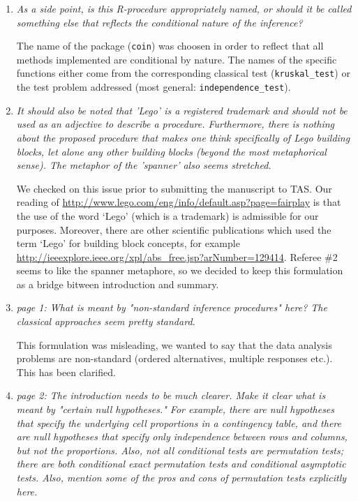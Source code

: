\documentclass[11pt]{article}
\begin{document}
\begin{enumerate}
\item \textsl{As a side point, is this R-procedure appropriately named, or should it be called 
              something else that reflects the conditional nature of the inference?}

The name of the package (\texttt{coin}) was choosen in order to reflect that
all methods implemented are conditional by nature. The names of the specific
functions either come from the corresponding classical test
(\texttt{kruskal\_test}) or the test problem addressed (most general:
\texttt{independence\_test}).

\item \textsl{It should also be noted that 'Lego' is a registered trademark and should not be used 
              as an adjective to describe a procedure. Furthermore, there is nothing about the 
              proposed procedure that makes one think specifically of Lego building blocks, 
              let alone any other building blocks (beyond the most metaphorical sense). The 
              metaphor of the 'spanner' also seems stretched.}

We checked on this issue prior to submitting the manuscript to TAS. Our
reading of \url{http://www.lego.com/eng/info/default.asp?page=fairplay} is
that the use of the word `Lego' (which is a trademark) is admissible for our
purposes. Moreover, there are other scientific publications which used the
term `Lego' for building block concepts, for example
\url{http://ieeexplore.ieee.org/xpl/abs_free.jsp?arNumber=129414}.
Referee \#2 seems to like the spanner
metaphore, so we decided to keep this formulation as a bridge bitween
introduction and summary.


\item \textsl{page 1:  What is meant by "non-standard inference procedures" here? The classical 
              approaches seem pretty standard.}

This formulation was misleading, we wanted to say that the data analysis
problems are non-standard (ordered alternatives, multiple responses etc.).
This has been clarified.

\item \textsl{page 2:  The introduction needs to be much clearer. Make it clear what is meant by 
              "certain null hypotheses." For example, there are null hypotheses that specify the 
              underlying cell proportions in a contingency table, and there are null hypotheses 
              that specify only independence between rows and columns, but not the proportions. 
              Also, not all conditional tests are permutation tests; there are both conditional 
              exact permutation tests and conditional asymptotic tests. Also, mention some of 
              the pros and cons of permutation tests explicitly here.}


\end{enumerate}
\end{document}
